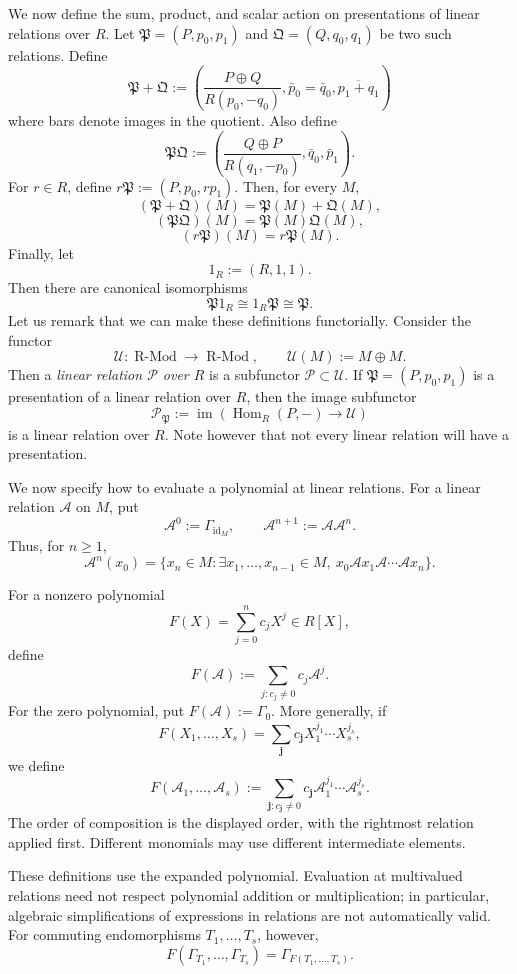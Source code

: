 \documentclass[11pt]{article}
\newcommand{\Hom}{\operatorname{Hom}}
\newcommand{\im}{\operatorname{im}}
\theoremstyle{plain}
\theoremstyle{definition}
\theoremstyle{remark}
\numberwithin{equation}{section}
\begin{document}
We now define the sum, product, and scalar action on presentations of linear relations over $R$. Let $\mathfrak P = (P, p_0, p_1)$ and $\mathfrak Q = (Q, q_0, q_1)$ be two such relations. Define \[\mathfrak P + \mathfrak Q := \left(\frac{P \oplus Q}{R(p_0, - q_0)}, \bar p_0 = \bar q_0, \overline{p_1 + q_1} \right)\] where bars denote images in the quotient. Also define \[\mathfrak P \mathfrak Q := \left(\frac{Q\oplus P}{R(q_1, - p_0)}, \bar q_0, \bar p_1 \right).\] For $r \in R$, define $r\mathfrak P := (P, p_0, rp_1)$.  Then, for every $M$, \[(\mathfrak P + \mathfrak Q)(M) = \mathfrak P(M) + \mathfrak Q(M),\] \[(\mathfrak P \mathfrak Q)(M) = \mathfrak P(M) \mathfrak Q(M), \] \[(r\mathfrak P)(M) = r \mathfrak P(M). \] Finally, let \[\mathfrak 1_R := (R, 1, 1).\] Then there are canonical isomorphisms \[\mathfrak P \mathfrak 1_R \cong \mathfrak 1_R \mathfrak P \cong \mathfrak P.\] Let us remark that we can make these definitions functorially. Consider the functor \[\mathscr U: \operatorname{R-Mod} \rightarrow \operatorname{R-Mod}, \qquad \mathscr U(M) := M \oplus M.\] Then a \emph{linear relation $\mathscr{P}$ over $R$} is a subfunctor $\mathscr P \subset \mathscr U$. If $\mathfrak P = (P, p_0, p_1)$ is a presentation of a linear relation over $R$, then the image subfunctor \[\mathscr P_{\mathfrak P} := \im \left(\Hom_R(P, -{}) \rightarrow \mathscr U\right)\] is a linear relation over $R$. Note however that not every linear relation will have a presentation. 

We now specify how to evaluate a polynomial at linear relations. For a linear relation \(\mathcal A\) on \(M\), put \[ \mathcal A^0:=\Gamma_{\mathrm{id}_M}, \qquad \mathcal A^{n+1}:=\mathcal A\mathcal A^n. \] Thus, for \(n\geq1\), \[ \mathcal A^n(x_0) = \{x_n\in M: \exists x_1,\ldots,x_{n-1}\in M,\  x_0\mathcal A x_1\mathcal A\cdots\mathcal A x_n\}. \] 

For a nonzero polynomial \[ F(X)=\sum_{j=0}^{n}c_jX^j\in R[X], \] define \[ F(\mathcal A):=\sum_{j:c_j\neq0}c_j\mathcal A^j. \] For the zero polynomial, put \(F(\mathcal A):=\Gamma_0\). More generally, if \[ F(X_1,\ldots,X_s) =\sum_{\boldsymbol j}c_{\boldsymbol j} X_1^{j_1}\cdots X_s^{j_s}, \] we define \[ F(\mathcal A_1,\ldots,\mathcal A_s) := \sum_{\boldsymbol j:c_{\boldsymbol j}\neq0} c_{\boldsymbol j} \mathcal A_1^{j_1}\cdots\mathcal A_s^{j_s}. \] The order of composition is the displayed order, with the rightmost relation applied first. Different monomials may use different intermediate elements. 

These definitions use the expanded polynomial. Evaluation at multivalued relations need not respect polynomial addition or multiplication; in particular, algebraic simplifications of expressions in relations are not automatically valid. For commuting endomorphisms \(T_1,\ldots,T_s\), however, \[ F(\Gamma_{T_1},\ldots,\Gamma_{T_s}) = \Gamma_{F(T_1,\ldots,T_s)}. \] 
\end{document}
